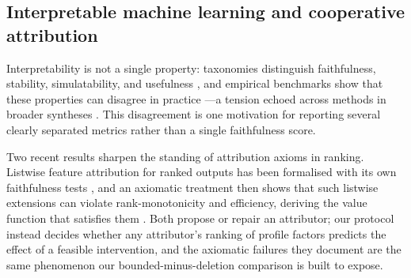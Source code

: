 \documentclass[manuscript,screen,review,anonymous]{acmart}
\begin{document}
\subsection{Interpretable machine learning and cooperative attribution}
Interpretability is not a single property: taxonomies distinguish faithfulness, stability, simulatability, and usefulness \citep{gilpin2018,arrieta2020}, and empirical benchmarks show that these properties can disagree in practice \citep{samek2017,deyoung2020}---a tension echoed across methods in broader syntheses \citep{molnar2022}. This disagreement is one motivation for reporting several clearly separated metrics rather than a single faithfulness score.

Two recent results sharpen the standing of attribution axioms in ranking. Listwise feature attribution for ranked outputs has been formalised with its own faithfulness tests \cite{heuss2024rankingshap}, and an axiomatic treatment then shows that such listwise extensions can violate rank-monotonicity and efficiency, deriving the value function that satisfies them \cite{chowdhury2025rankshap}. Both propose or repair an attributor; our protocol instead decides whether any attributor's ranking of profile factors predicts the effect of a feasible intervention, and the axiomatic failures they document are the same phenomenon our bounded-minus-deletion comparison is built to expose.
\end{document}
